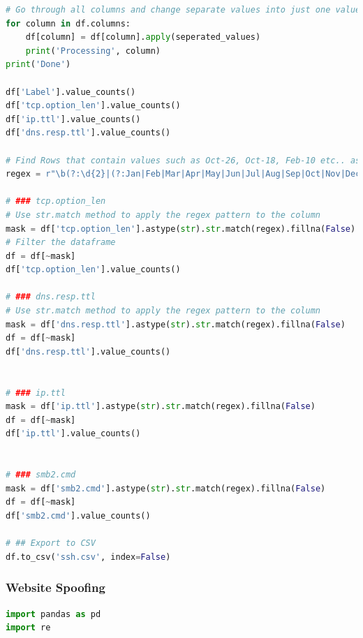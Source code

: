 \begin{appendices}
\begin{lstlisting}[language=Python]
# Go through all columns and change separate values into just one value
for column in df.columns:
    df[column] = df[column].apply(seperated_values)
    print('Processing', column)
print('Done')

df['Label'].value_counts()
df['tcp.option_len'].value_counts()
df['ip.ttl'].value_counts()
df['dns.resp.ttl'].value_counts()

# Find Rows that contain values such as Oct-26, Oct-18, Feb-10 etc.. as these appear to be invalid and we will drop these rows.
regex = r"\b(?:\d{2}|(?:Jan|Feb|Mar|Apr|May|Jun|Jul|Aug|Sep|Oct|Nov|Dec))-(?:\d{2}|(?:Jan|Feb|Mar|Apr|May|Jun|Jul|Aug|Sep|Oct|Nov|Dec))\b"

# ### tcp.option_len
# Use str.match method to apply the regex pattern to the column
mask = df['tcp.option_len'].astype(str).str.match(regex).fillna(False)
# Filter the dataframe
df = df[~mask]
df['tcp.option_len'].value_counts()

# ### dns.resp.ttl
# Use str.match method to apply the regex pattern to the column
mask = df['dns.resp.ttl'].astype(str).str.match(regex).fillna(False)
df = df[~mask]
df['dns.resp.ttl'].value_counts()


# ### ip.ttl
mask = df['ip.ttl'].astype(str).str.match(regex).fillna(False)
df = df[~mask]
df['ip.ttl'].value_counts()


# ### smb2.cmd
mask = df['smb2.cmd'].astype(str).str.match(regex).fillna(False)
df = df[~mask]
df['smb2.cmd'].value_counts()

# ## Export to CSV
df.to_csv('ssh.csv', index=False)	
\end{lstlisting}

\subsubsection*{Website Spoofing}
\begin{lstlisting}[language=Python]
import pandas as pd
import re


\end{lstlisting}
\end{appendices}
